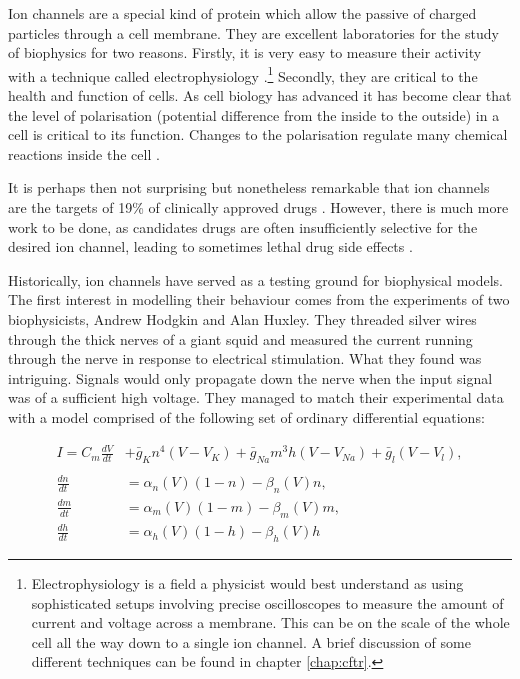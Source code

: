 Ion channels are a special kind of protein which allow the passive of charged particles through a cell membrane. They are excellent laboratories for the study of biophysics for two reasons. Firstly, it is very easy to measure their activity with a technique called electrophysiology \cite{hille2001}.\footnote{Electrophysiology is a field a physicist would best understand as using sophisticated setups involving precise oscilloscopes to measure the amount of current and voltage across a membrane. This can be on the scale of the whole cell all the way down to a single ion channel. A brief discussion of some different techniques can be found in chapter \ref{chap:cftr}.} Secondly, they are critical to the health and function of cells. As cell biology has advanced it has become clear that the level of polarisation (potential difference from the inside to the outside) in a cell is critical to its function. Changes to the polarisation regulate many chemical reactions inside the cell \cite{catterall2011, muthuswamy2012, levin2014, levin2014a}. 

It is perhaps then not surprising but nonetheless remarkable that ion channels are the targets of 19\% of clinically approved drugs \cite{santos2017}. However, there is much more work to be done, as candidates drugs are often insufficiently selective for the desired ion channel, leading to sometimes lethal drug side effects \cite{stansfeld2006, kaczorowski2008, waszkielewicz2013}.

Historically, ion channels have served as a testing ground for biophysical models. The first interest in modelling their behaviour comes from the experiments of two biophysicists, Andrew Hodgkin and Alan Huxley. They threaded silver wires through the thick nerves of a giant squid and measured the current running through the nerve in response to electrical stimulation. What they found was intriguing. Signals would only propagate down the nerve when the input signal was of a sufficient high voltage. They managed to match their experimental data with a model comprised of the following set of ordinary differential equations:

\begin{equation}
	\label{hh_equations}
\begin{aligned}
	I = C_m \frac{dV}{dt} &+ \bar{g}_K n^4 (V - V_K) + \bar{g}_{Na} m^3 h (V - V_{Na} ) + \bar{g}_l (V-V_l) , \\ \\
	\frac{dn}{dt} &= \alpha_n(V)  (1-n) - \beta_n(V)  n, \\
	\frac{dm}{dt} &= \alpha_m(V)  (1-m) - \beta_m(V)  m, \\ 
	\frac{dh}{dt} &= \alpha_h(V)  (1-h) - \beta_h(V)  h  
\end{aligned}
\end{equation}

